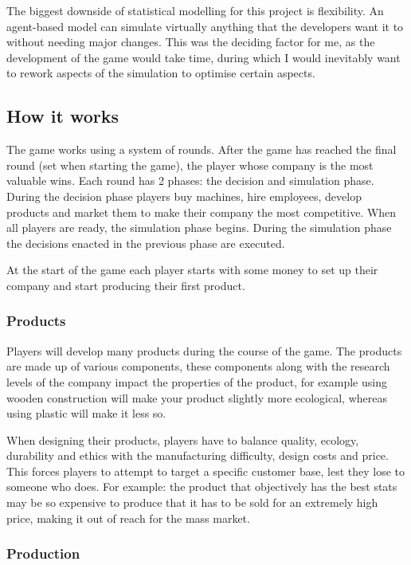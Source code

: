 The biggest downside of statistical modelling for this project is flexibility.
An agent-based model can simulate virtually anything that the developers want it to
without needing major changes. This was the deciding factor for me, as
the development of the game would take time, during which I would inevitably want
to rework aspects of the simulation to optimise certain aspects.

\subsection{How it works}

The game works using a system of rounds. After the game has reached the final round (set when starting the game), the
player whose company is the most valuable wins. Each round has 2 phases: the decision and simulation phase. During the
decision phase players buy machines, hire employees, develop products and market them to make their company the most competitive. When
all players are ready, the simulation phase begins. During the simulation phase the decisions enacted in the previous phase
are executed.

At the start of the game each player starts with some money to set up their company and start producing their first product.

\subsubsection{Products}

Players will develop many products during the course of the game. The products are made up of various components, these
components along with the research levels of the company impact the properties of the product, for example using wooden
construction will make your product slightly more ecological, whereas using plastic will make it less so.

When designing their products, players have to balance quality, ecology, durability and ethics with the manufacturing difficulty, design costs and price.
This forces players to attempt to target a specific customer base, lest they lose to someone who does. For example:
the product that objectively has the best stats may be so expensive to produce that it has to be sold for an extremely high price,
making it out of reach for the mass market.

\subsubsection{Production}

